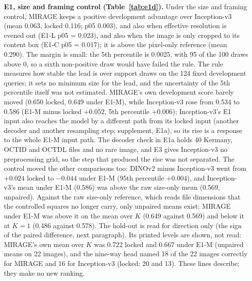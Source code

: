 \documentclass[conference]{IEEEtran}
\begin{document}
\textbf{E1, size and framing control (Table~\ref{tab:e1d}).} Under the size and framing control, MIRAGE keeps a positive development advantage over Inception-v3 (mean 0.063, locked 0.116; p05 0.003), and also when effective resolution is evened out (E1-L p05 = 0.023), and also when the image is only cropped to its content box (E1-C p05 = 0.017); it is above the pixel-only reference (mean 0.290). The margin is small: the 5th percentile is 0.0025, with 95 of the 100 draws above 0, so a sixth non-positive draw would have failed the rule. The rule measures how stable the lead is over support draws on the 124 fixed development queries; it sets no minimum size for the lead, and the uncertainty of the 5th percentile itself was not estimated. MIRAGE's own development score barely moved (0.650 locked, 0.649 under E1-M), while Inception-v3 rose from 0.534 to 0.586 (E1-M minus locked $+0.052$, 5th percentile $+0.006$); Inception-v3's E1 input also reaches the model by a different path from its locked input (another decoder and another resampling step; supplement, E1a), so its rise is a response to the whole E1-M input path. The decoder check in E1a holds 40 Kermany, OCTID and OCTDL files and no rare image, and E3 gives Inception-v3 no preprocessing grid, so the step that produced the rise was not separated. The control moved the other comparisons too: DINOv2 minus Inception-v3 went from $+0.024$ locked to $-0.044$ under E1-M (95th percentile $+0.004$), and Inception-v3's mean under E1-M (0.586) was above the raw size-only mean (0.569, unpaired). Against the raw size-only reference, which reads file dimensions that the controlled squares no longer carry, only unpaired means exist: MIRAGE under E1-M was above it on the mean over $K$ (0.649 against 0.569) and below it at $K=1$ (0.486 against 0.578). The hold-out is read for direction only (the sign of the paired difference, next paragraph). Its printed levels are shown, not read: MIRAGE's own mean over $K$ was 0.722 locked and 0.667 under E1-M (unpaired means on 22 images), and the nine-way head named 18 of the 22 images correctly for MIRAGE and 16 for Inception-v3 (locked: 20 and 13). These lines describe; they make no new ranking.
\end{document}
